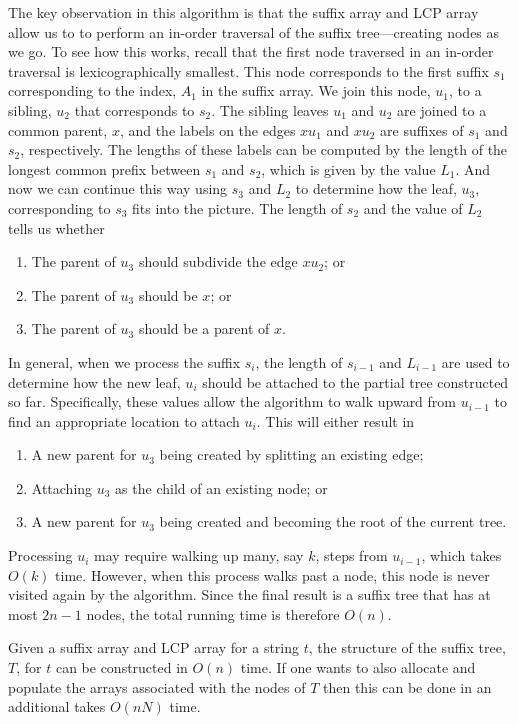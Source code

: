 The key observation in this algorithm is that the suffix array and LCP array allow us to to perform an in-order traversal of the suffix tree---creating nodes as we go.  To see how this works, recall that the first node traversed in an in-order traversal is lexicographically smallest.  This node corresponds to the first suffix $s_1$ corresponding to the index, $A_1$ in the suffix array.  We join this node, $u_1$, to a sibling, $u_2$ that corresponds to $s_2$.  The sibling leaves $u_1$ and $u_2$ are joined to a common parent, $x$, and the labels on the edges $xu_1$ and $xu_2$ are suffixes of $s_1$ and $s_2$, respectively.  The lengths of these labels can be computed by the length of the longest common prefix between $s_1$ and $s_2$, which is given by the value $L_1$.  And now we can continue this way using $s_3$ and $L_2$ to determine how the leaf, $u_3$, corresponding to $s_3$ fits into the picture.  The length of $s_2$ and the value of $L_2$ tells us whether 
\begin{enumerate}
  \item The parent of $u_3$ should subdivide the edge $xu_2$; or
  \item The parent of $u_3$ should be $x$; or
  \item The parent of $u_3$ should be a parent of $x$.
\end{enumerate}
In general, when we process the suffix $s_i$, the length of $s_{i-1}$ and $L_{i-1}$ are used to determine how the new leaf, $u_i$ should be attached to the partial tree constructed so far.  Specifically, these values allow the algorithm to walk upward from $u_{i-1}$ to find an appropriate location to attach $u_i$.  This will either result in 
\begin{enumerate}
  \item A new parent for $u_3$ being created by splitting an existing edge;
  \item Attaching $u_3$ as the child of an existing node; or
  \item A new parent for $u_3$ being created and becoming the root of the current tree.
\end{enumerate}
Processing $u_i$ may require walking up many, say $k$, steps from $u_{i-1}$, 
which takes $O(k)$ time. However, when this process walks past a node, this node is never visited again by the algorithm. Since the final result is a suffix tree that has at most $2n-1$ nodes, the total running time is therefore $O(n)$.

\begin{thm}
  Given a suffix array and LCP array for a string $t$, the structure of the suffix tree, $T$, for $t$ can be constructed in $O(n)$ time.  If one wants to also allocate and populate the arrays associated with the nodes of $T$ then this can be done in an additional takes $O(nN)$ time.
\end{thm}


